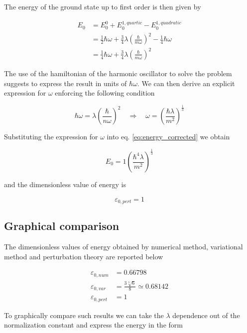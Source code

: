 \documentclass{article}
\begin{document}
The energy of the ground state up to first order is then given by

\begin{align}
\label{eq:energy_corrected}
E_0 & = E_0^0 + E_0^{1,quartic} - E_0^{1,quadratic} \nonumber \\
& = \frac{1}{2} \hbar \omega + \frac{3}{4} \lambda \left(\frac{\hbar}{m\omega} \right)^2 - \frac{1}{4} \hbar \omega \nonumber \\
& = \frac{1}{4} \hbar \omega + \frac{3}{4} \lambda \left(\frac{\hbar}{m\omega} \right)^2
\end{align}

The use of the hamiltonian of the harmonic oscillator to solve the problem suggests to express the result in units of \( \hbar \omega \). We can then derive an explicit expression for \( \omega \) enforcing the following condition

\begin{equation}
\hbar \omega = \lambda \left( \frac{\hbar}{n \omega} \right)^2 \quad \Rightarrow \quad \omega = \left( \frac{\hbar \lambda}{m^2} \right)^{\frac{1}{3}}
\end{equation}

Substituting the expression for \( \omega \) into eq. \eqref{eq:energy_corrected} we obtain

\begin{equation}
E_0 = 1 \left( \frac{\hbar^4 \lambda}{m^2} \right)^{\frac{1}{3}}
\end{equation}

and the dimensionless value of energy is

\begin{equation}
\varepsilon_{0,pert} = 1
\end{equation}

\subsection{Graphical comparison}
The dimensionless values of energy obtained by numerical method, variational method and perturbation theory are reported below

\begin{align*}
\varepsilon_{0,num} & = 0.66798 \\
\varepsilon_{0,var} & = \frac{3\sqrt[3]{6}}{8} \simeq 0.68142 \\
\varepsilon_{0,pert} & = 1
\end{align*}

To graphically compare such results we can take the \(\lambda \) dependence out of the normalization constant and express the energy in the form
\end{document}
